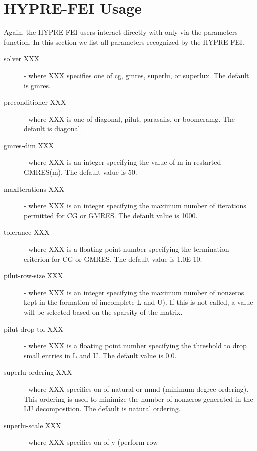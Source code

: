 \section{HYPRE-FEI Usage}

Again, the HYPRE-FEI users interact directly with \hypre{} only via the {\sf parameters}
function.  In this section we list all parameters recognized by the HYPRE-FEI.

\begin{description}
\item[solver XXX] - where XXX specifies one of {\sf cg}, {\sf gmres},
                    {\sf superlu}, or {\sf superlux}.  The default is {\sf gmres}.
\item[preconditioner XXX] - where XXX is one of {\sf diagonal}, {\sf pilut},
                    {\sf parasails}, or {\sf boomeramg}. The default 
                    is {\sf diagonal}.
\item[gmres-dim XXX] - where XXX is an integer specifying the value of m in
                       restarted GMRES(m).  The default value is 50.
\item[maxIterations XXX] - where XXX is an integer specifying the maximum number
                           of iterations permitted for CG or GMRES.
                           The default value is 1000.
\item[tolerance XXX] - where XXX is a floating point number specifying the 
                       termination criterion for CG or GMRES.  The default value is
                       1.0E-10.
\item[pilut-row-size XXX] - where XXX is an integer specifying the maximum
                       number of nonzeros kept in the formation of imcomplete L
                       and U).  If this is not called, a value will be selected
                       based on the sparsity of the matrix.
\item[pilut-drop-tol XXX] - where XXX is a floating point number specifying the 
                       threshold to drop small entries in L and U.  The default
                       value is 0.0.
\item[superlu-ordering XXX] - where XXX specifies on of {\sf natural} or
                       {\sf mmd} (minimum degree ordering).  This ordering
                       is used to minimize the number of nonzeros generated
                       in the LU decomposition.  The default is natural ordering.
\item[superlu-scale XXX] - where XXX specifies on of {\sf y} (perform row

\end{description}
